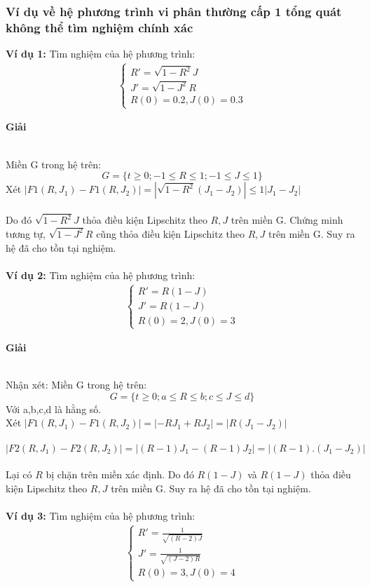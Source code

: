 \subsubsection{Ví dụ về hệ phương trình vi phân thường cấp 1 tổng quát không thể tìm nghiệm chính xác}
\textbf{Ví dụ 1:} Tìm nghiệm của hệ phương trình:
\begin{align*}
    \begin{cases}
        R'=\sqrt{1-R^2}J\\
        J'=\sqrt{1-J^2}R \\
        R(0)=0.2, J(0)=0.3
    \end{cases}
\end{align*}
\centerline{\textbf{Giải}}\\
Miền G trong hệ trên:
$$G=\{t \geq 0; -1 \leq R \leq 1; -1 \leq J \leq 1\}$$
Xét $|F1(R,J_1)-F1(R,J_2)|=|\sqrt{1-R^2}(J_1-J_2)|\leq 1|J_1-J_2|$\\\\
Do đó $\sqrt{1-R^2}J$ thỏa điều kiện Lipschitz theo $R,J$ trên miền G. Chứng minh tương tự, $\sqrt{1-J^2}R$ cũng thỏa điều kiện Lipschitz theo $R,J$ trên miền G.
Suy ra hệ đã cho tồn tại nghiệm.\\\\
\textbf{Ví dụ 2:} Tìm nghiệm của hệ phương trình:
\begin{align*}
    \begin{cases}
        R'=R(1 - J) \\
        J'=R(1 - J) \\
        R(0)=2, J(0)=3
    \end{cases}
\end{align*}
\centerline{\textbf{Giải}}\\
Nhận xét: Miền G trong hệ trên:
$$G=\{t \geq 0; a \leq R \leq b; c \leq J \leq d\}$$
Với a,b,c,d là hằng số.\\
Xét $|F1(R,J_1)-F1(R,J_2)|=|-RJ_1+RJ_2|=|R(J_1-J_2)|$\\\\
\hspace*{0.7cm}$|F2(R,J_1)-F2(R,J_2)|=|(R-1)J_1-(R-1)J_2|=|(R-1).(J_1-J_2)|$\\\\
Lại có $R$ bị chặn trên miền xác định. Do đó $R(1 - J)$ và $R(1 - J)$ thỏa điều kiện Lipschitz theo $R,J$ trên miền G. Suy ra hệ đã cho tồn tại nghiệm.\\\\
\textbf{Ví dụ 3:} Tìm nghiệm của hệ phương trình:
\begin{align*}
    \begin{cases}
        R'=\frac{1}{\sqrt{(R-2)J}} \\
        J'=\frac{1}{\sqrt{(J-2)R}} \\
        R(0)=3, J(0)=4
    \end{cases}
\end{align*}
